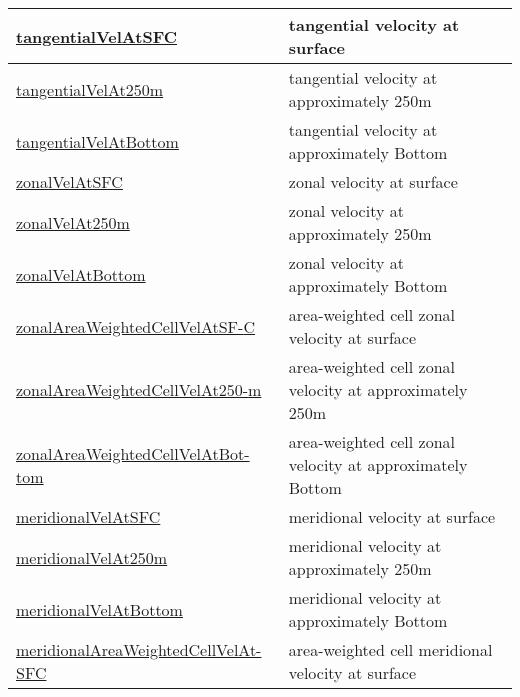 {\begin{center}
\begin{longtable}{| p{2.0in} | p{4.0in} |}
    \hline
    \hyperref[subsec:var_sec_highFrequencyOutputAM_tangentialVelAtSFC]{tangentialVelAtSFC} & tangential velocity at surface \\
    \hline
    \hyperref[subsec:var_sec_highFrequencyOutputAM_tangentialVelAt250m]{tangentialVelAt250m} & tangential velocity at approximately 250m \\
    \hline
    \hyperref[subsec:var_sec_highFrequencyOutputAM_tangentialVelAtBottom]{tangentialVelAtBottom} & tangential velocity at approximately Bottom \\
    \hline
    \hyperref[subsec:var_sec_highFrequencyOutputAM_zonalVelAtSFC]{zonalVelAtSFC} & zonal velocity at surface \\
    \hline
    \hyperref[subsec:var_sec_highFrequencyOutputAM_zonalVelAt250m]{zonalVelAt250m} & zonal velocity at approximately 250m \\
    \hline
    \hyperref[subsec:var_sec_highFrequencyOutputAM_zonalVelAtBottom]{zonalVelAtBottom} & zonal velocity at approximately Bottom \\
    \hline
    \hyperref[subsec:var_sec_highFrequencyOutputAM_zonalAreaWeightedCellVelAtSFC]{zonalAreaWeightedCellVelAtSF-}\hyperref[subsec:var_sec_highFrequencyOutputAM_zonalAreaWeightedCellVelAtSFC]{C  }& area-weighted cell zonal velocity at surface \\
    \hline
    \hyperref[subsec:var_sec_highFrequencyOutputAM_zonalAreaWeightedCellVelAt250m]{zonalAreaWeightedCellVelAt250-}\hyperref[subsec:var_sec_highFrequencyOutputAM_zonalAreaWeightedCellVelAt250m]{m  }& area-weighted cell zonal velocity at approximately 250m \\
    \hline
    \hyperref[subsec:var_sec_highFrequencyOutputAM_zonalAreaWeightedCellVelAtBottom]{zonalAreaWeightedCellVelAtBot-}\hyperref[subsec:var_sec_highFrequencyOutputAM_zonalAreaWeightedCellVelAtBottom]{tom  }& area-weighted cell zonal velocity at approximately Bottom \\
    \hline
    \hyperref[subsec:var_sec_highFrequencyOutputAM_meridionalVelAtSFC]{meridionalVelAtSFC} & meridional velocity at surface \\
    \hline
    \hyperref[subsec:var_sec_highFrequencyOutputAM_meridionalVelAt250m]{meridionalVelAt250m} & meridional velocity at approximately 250m \\
    \hline
    \hyperref[subsec:var_sec_highFrequencyOutputAM_meridionalVelAtBottom]{meridionalVelAtBottom} & meridional velocity at approximately Bottom \\
    \hline
    \hyperref[subsec:var_sec_highFrequencyOutputAM_meridionalAreaWeightedCellVelAtSFC]{meridionalAreaWeightedCellVelAt-}\hyperref[subsec:var_sec_highFrequencyOutputAM_meridionalAreaWeightedCellVelAtSFC]{SFC  }& area-weighted cell meridional velocity at surface \\

\end{longtable}
\end{center}}
